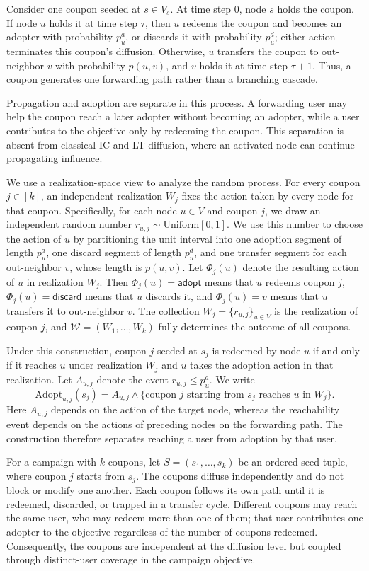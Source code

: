 \documentclass[sigconf,balance=false]{acmart}
\begin{document}
Consider one coupon seeded at $s\in V_s$.
At time step $0$, node $s$ holds the coupon.
If node $u$ holds it at time step $\tau$, then $u$ redeems the coupon and
becomes an adopter with probability $p_u^a$, or discards it with
probability $p_u^d$; either action terminates this coupon's diffusion.
Otherwise, $u$ transfers the coupon to out-neighbor $v$ with probability
$p(u,v)$, and $v$ holds it at time step $\tau+1$.
Thus, a coupon generates one forwarding path rather than a branching
cascade.

Propagation and adoption are separate in this process.
A forwarding user may help the coupon reach a later adopter without
becoming an adopter, while a user contributes to the objective only by
redeeming the coupon.
This separation is absent from classical IC and LT diffusion, where an
activated node can continue propagating influence.

We use a realization-space view to analyze the random process.
For every coupon $j\in[k]$, an independent realization $W_j$ fixes the
action taken by every node for that coupon.
Specifically, for each node $u\in V$ and coupon $j$, we draw an
independent random number $r_{u,j}\sim\mathrm{Uniform}[0,1]$.
We use this number to choose the action of $u$ by partitioning the unit
interval into one adoption segment of length $p_u^a$, one discard
segment of length $p_u^d$, and one transfer segment for each
out-neighbor $v$, whose length is $p(u,v)$.
Let $\Phi_j(u)$ denote the resulting action of $u$ in realization $W_j$.
Then $\Phi_j(u)=\textsf{adopt}$ means that $u$ redeems coupon $j$,
$\Phi_j(u)=\textsf{discard}$ means that $u$ discards it, and
$\Phi_j(u)=v$ means that $u$ transfers it to out-neighbor $v$.
The collection $W_j=\{r_{u,j}\}_{u\in V}$ is the realization of coupon
$j$, and $\mathcal{W}=(W_1,\ldots,W_k)$ fully determines the outcome of
all coupons.

Under this construction, coupon $j$ seeded at $s_j$ is redeemed by node $u$
if and only if it reaches $u$ under realization $W_j$ and $u$ takes the
adoption action in that realization.
Let $A_{u,j}$ denote the event $r_{u,j}\leq p_u^a$.
We write
\[
  \mathrm{Adopt}_{u,j}(s_j)
  = A_{u,j}\wedge
    \{\text{coupon }j\text{ starting from }s_j
      \text{ reaches }u\text{ in }W_j\}.
\]
Here $A_{u,j}$ depends on the action of the target node, whereas the
reachability event depends on the actions of preceding nodes on the
forwarding path.
The construction therefore separates reaching a user from adoption by
that user.

For a campaign with $k$ coupons, let $S=(s_1,\ldots,s_k)$ be an ordered
seed tuple, where coupon $j$ starts from $s_j$.
The coupons diffuse independently and do not block or modify one another.
Each coupon follows its own path until it is redeemed, discarded, or
trapped in a transfer cycle.
Different coupons may reach the same user, who may redeem more than one of
them; that user contributes one adopter to the objective regardless of the
number of coupons redeemed.
Consequently, the coupons are independent at the diffusion level but
coupled through distinct-user coverage in the campaign objective.
\end{document}
